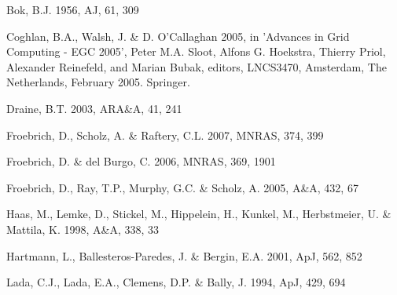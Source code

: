 \documentclass[useAMS,usenatbib]{mn2e}
\begin{document}
\begin{thebibliography}{}

Bok, B.J. 1956, AJ, 61, 309 

Coghlan, B.A., Walsh, J. \& D. O'Callaghan 2005, in 'Advances in Grid Computing - EGC 2005', Peter M.A. Sloot, Alfons G. Hoekstra, Thierry Priol, Alexander Reinefeld, and Marian Bubak, editors, LNCS3470, Amsterdam, The Netherlands, February 2005. Springer.

Draine, B.T. 2003, ARA\&A, 41, 241

Froebrich, D., Scholz, A. \& Raftery, C.L. 2007, MNRAS, 374, 399

Froebrich, D. \& del Burgo, C. 2006, MNRAS, 369, 1901

Froebrich, D., Ray, T.P., Murphy, G.C. \& Scholz, A. 2005, A\&A, 432, 67

Haas, M., Lemke, D., Stickel, M., Hippelein, H., Kunkel, M., Herbstmeier, U. \& Mattila, K. 1998, A\&A, 338, 33

Hartmann, L., Ballesteros-Paredes, J. \& Bergin, E.A. 2001, ApJ, 562, 852



Lada, C.J., Lada, E.A., Clemens, D.P. \& Bally, J. 1994, ApJ, 429, 694


\end{thebibliography}
\end{document}
